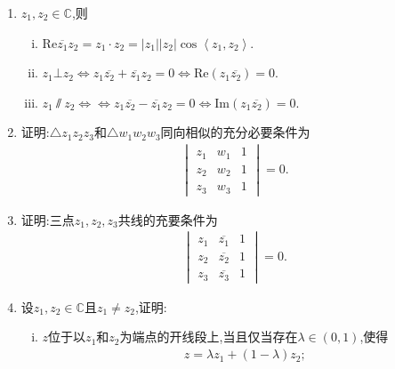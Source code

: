 \documentclass[../../main.tex]{subfiles}%
\begin{document}
\begin{proposition}[复数的几何性质]\label{proposition:复数的几何性质结论}
\begin{enumerate}[(1)]
\item\label{proposition:复数的几何性质结论-1} $z_1,z_2\in \mathbb{C}$,则
\begin{enumerate}[(i)]
\item\label{proposition:复数的几何性质结论-1-0} $\mathrm{Re}\overline{z_1}z_2=z_1\cdot z_2=\left| z_1 \right|\left| z_2 \right|\cos \left< z_1,z_2 \right> .$

\item\label{proposition:复数的几何性质结论-1-1} $z_1\bot z_2 \iff z_1\overline{z_2}+\overline{z_1}z_2=0 \iff \mathrm{Re}(z_1\overline{z_2}) = 0$.

\item\label{proposition:复数的几何性质结论-1-2} \(z_1\varparallel z_2\iff \iff z_1\overline{z_2}-\overline{z_1}z_2=0 \iff \mathrm{Im}(z_1\overline{z_2}) = 0\).
\end{enumerate}

\item\label{proposition:复数的几何性质结论-2} 证明:$\triangle z_1z_2z_3$和$\triangle w_1w_2w_3$同向相似的充分必要条件为
\begin{align*}
\begin{vmatrix}
z_1 & w_1 & 1 \\
z_2 & w_2 & 1 \\
z_3 & w_3 & 1
\end{vmatrix} = 0.
\end{align*}

\item 证明:三点$z_1,z_2,z_3$共线的充要条件为
\begin{align*}
\begin{vmatrix}
z_1 & \overline{z_1} & 1 \\
z_2 & \overline{z_2} & 1 \\
z_3 & \overline{z_3} & 1
\end{vmatrix} = 0.
\end{align*}

\item\label{proposition:复数的几何性质结论-3} 设$z_1,z_2\in \mathbb{C}$且$z_1 \neq z_2$,证明:
\begin{enumerate}[(i)]
\item $z$位于以$z_1$和$z_2$为端点的开线段上,当且仅当存在$\lambda \in (0,1)$,使得
\begin{align*}
z = \lambda z_1 + (1 - \lambda) z_2;
\end{align*}


\end{enumerate}
\end{enumerate}
\end{proposition}
\end{document}

